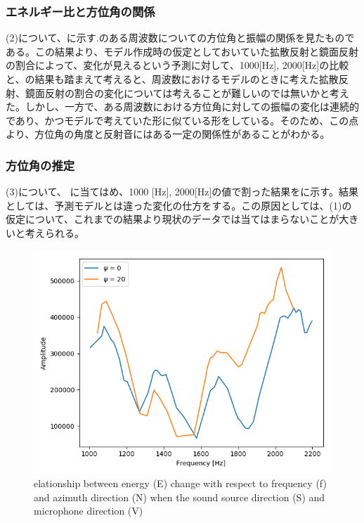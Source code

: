 \subsubsection{エネルギー比と方位角の関係}
(2)について、に示す.のある周波数についての方位角と振幅の関係を見たものである。この結果より、モデル作成時の仮定としておいていた拡散反射と鏡面反射の割合によって、変化が見えるという予測に対して、1000[Hz], 2000[Hz]の比較と、の結果も踏まえて考えると、周波数におけるモデルのときに考えた拡散反射、鏡面反射の割合の変化については考えることが難しいのでは無いかと考えた。しかし、一方で、ある周波数における方位角に対しての振幅の変化は連続的であり、かつモデルで考えていた形に似ている形をしている。そのため、この点より、方位角の角度と反射音にはある一定の関係性があることがわかる。

\subsubsection{方位角の推定}
(3)について、 に当てはめ、1000 [Hz], 2000[Hz]の値で割った結果をに示す。結果としては、予測モデルとは違った変化の仕方をする。この原因としては、(1)の仮定について、これまでの結果より現状のデータでは当てはまらないことが大きいと考えられる。

\begin{figure}[ht]
  \begin{center}
  \vspace{1zh}
    \includegraphics[width=0.5\linewidth]{images/3_amp_fre_heimen.png}   
  \end{center}
  \vspace{-2zh}
  \caption{elationship between energy (E) change with respect to frequency (f) and azimuth direction (N) when the sound source direction (S) and microphone direction (V)}
  \label{fig:result1}
\end{figure}

